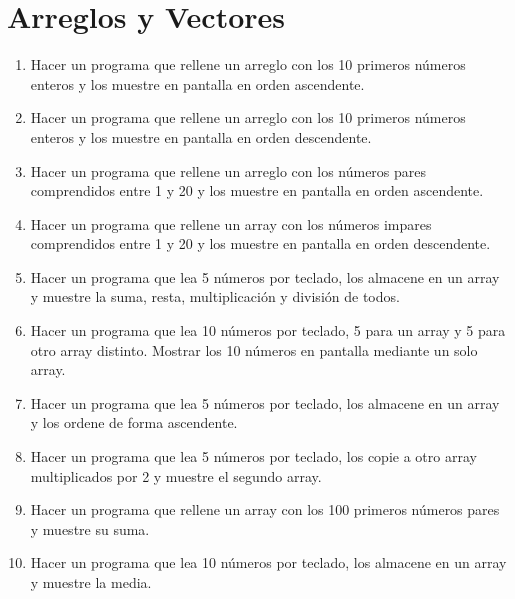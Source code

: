 \documentclass{scrartcl}
\begin{document}
	\section{Arreglos y Vectores}
	
	\begin{enumerate}
		\item Hacer un programa que rellene un arreglo con los 10 primeros números enteros	y los muestre en pantalla en orden ascendente.
		\item Hacer un programa que rellene un arreglo con los 10 primeros números enteros	y los muestre en pantalla en orden descendente.
		\item Hacer un programa que rellene un arreglo con los números pares comprendidos entre 1 y 20 y los muestre en pantalla en orden ascendente.
		\item Hacer un programa que rellene un array con los números impares comprendidos entre 1 y 20 y los muestre en pantalla en orden descendente.
		\item Hacer un programa que lea 5 números por teclado, los almacene en un array y muestre la suma, resta, multiplicación y división de todos.
		\item Hacer un programa que lea 10 números por teclado, 5 para un array y 5 para otro array distinto. Mostrar los 10 números en pantalla mediante un solo array.
		\item Hacer un programa que lea 5 números por teclado, los almacene en un array y los ordene de forma ascendente.
		\item Hacer un programa que lea 5 números por teclado, los copie a otro array	multiplicados por 2 y muestre el segundo array.
		\item Hacer un programa que rellene un array con los 100 primeros números pares y muestre su suma.
		\item Hacer un programa que lea 10 números por teclado, los almacene en un array y muestre la media.
	\end{enumerate}
\end{document}
